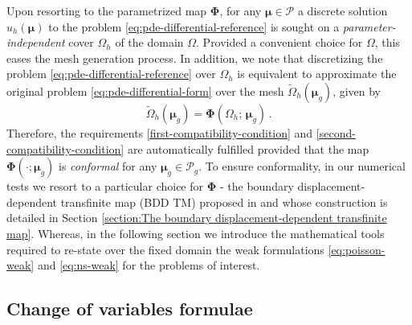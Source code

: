 \documentclass[12pt, a4paper, twoside, openright]{report}
\numberwithin{equation}{chapter}
\theoremstyle{theorem}
\theoremstyle{definition}
\theoremstyle{remark}
\theoremstyle{proposition}
\numberwithin{figure}{chapter}
\newcommand{\wt}[1]{\widetilde{#1}}
\newcommand{\bg}[1]{\boldsymbol{#1}}
\begin{document}
		Upon resorting to the parametrized map $\bg{\Phi}$, for any $\bg{\mu} \in \mathcal{P}$ a discrete solution $u_h(\bg{\mu})$ to the problem \eqref{eq:pde-differential-reference} is sought on a \emph{parameter-independent} cover $\Omega_h$ of the domain $\Omega$. Provided a convenient choice for $\Omega$, this eases the mesh generation process. In addition, we note that discretizing the problem \eqref{eq:pde-differential-reference} over $\Omega_h$ is equivalent to approximate the original problem \eqref{eq:pde-differential-form} over the mesh $\wt{\Omega}_h(\bg{\mu}_g)$, given by
		\begin{equation}
			\label{eq:parametrized-map-discrete}
			\wt{\Omega}_h(\bg{\mu}_g) = \bg{\Phi}(\Omega_h; \, \bg{\mu}_g) \, .
		\end{equation}
		Therefore, the requirements \ref{first-compatibility-condition} and \ref{second-compatibility-condition} are automatically fulfilled provided that the map $\bg{\Phi}(\cdot; \bg{\mu}_g)$ is \emph{conformal} for any $\bg{\mu}_g \in \mathcal{P}_g$. To ensure conformality, in our numerical tests we resort to a particular choice for $\bg{\Phi}$ - the boundary displacement-dependent transfinite map (BDD TM) proposed in \cite{JIR14} and whose construction is detailed in Section \ref{section:The boundary displacement-dependent transfinite map}. Whereas, in the following section we introduce the mathematical tools required to re-state over the fixed domain the weak formulations \eqref{eq:poisson-weak} and \eqref{eq:ns-weak} for the problems of interest.
		
	\vspace*{0.3cm}
		
	\subsection{Change of variables formulae}
	\label{section:Change of variables formulae}   
	
\end{document}
